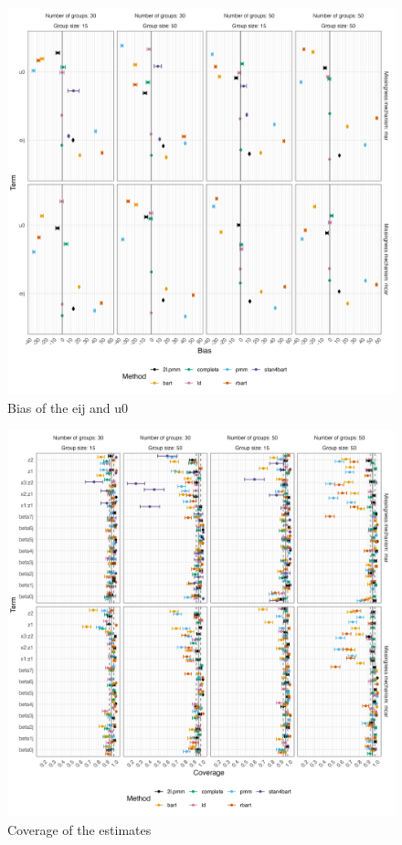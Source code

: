 \documentclass[10pt, a4paper, titlepage]{article}
\begin{document}
\begin{figure}[H]
    \centering
    \label{fig:bias2}
    \includegraphics[width=1\textwidth]{bias2.png}
    \caption{Bias of the eij and u0}
\end{figure}

\begin{figure}[H]
    \centering
    \label{fig:coverage}
    \includegraphics[width=1\textwidth]{coverage.png}
    \caption{Coverage of the estimates}
\end{figure}
\end{document}
